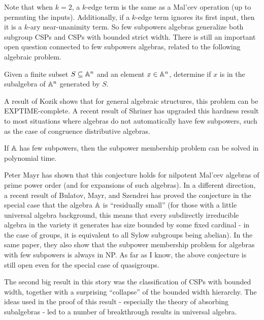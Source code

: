 \documentclass[letterpaper,11pt]{article}
\begin{document}
Note that when $k = 2$, a $k$-edge term is the same as a Mal'cev operation (up to permuting the inputs). Additionally, if a $k$-edge term ignores its first input, then it is a $k$-ary near-unanimity term. So few subpowers algebras generalize both subgroup CSPs and CSPs with bounded strict width. There is still an important open question connected to few subpowers algebras, related to the following algebraic problem.

\begin{prob} Given a finite subset $S \subseteq \mathbb{A}^n$ and an element $x \in \mathbb{A}^n$, determine if $x$ is in the subalgebra of $\mathbb{A}^n$ generated by $S$.
\end{prob}

A result of Kozik \cite{kozik-subpower-exptime} shows that for general algebraic structures, this problem can be EXPTIME-complete. A recent result of Shriner \cite{subpower-hardness} has upgraded this hardness result to most situations where algebras do not automatically have few subpowers, such as the case of congruence distributive algebras.

\begin{conj} If $\mathbb{A}$ has few subpowers, then the subpower membership problem can be solved in polynomial time.
\end{conj}

Peter Mayr \cite{subpower-supernilpotent} has shown that this conjecture holds for nilpotent Mal'cev algebras of prime power order (and for expansions of such algebras). In a different direction, a recent result of Bulatov, Mayr, and Szendrei \cite{subpower-residually-small} has proved the conjecture in the special case that the algebra $\mathbb{A}$ is ``residually small'' (for those with a little universal algebra background, this means that every subdirectly irreducible algebra in the variety it generates has size bounded by some fixed cardinal - in the case of groups, it is equivalent to all Sylow subgroups being abelian). In the same paper, they also show that the subpower membership problem for algebras with few subpowers is always in NP. As far as I know, the above conjecture is still open even for the special case of quasigroups.

The second big result in this story was the classification of CSPs with bounded width, together with a surprising ``collapse'' of the bounded width hierarchy. The ideas used in the proof of this result - especially the theory of absorbing subalgebras - led to a number of breakthrough results in universal algebra.
\end{document}
